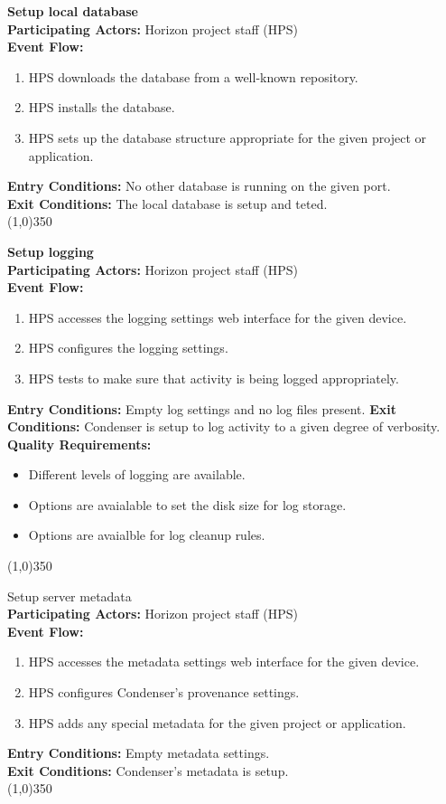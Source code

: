 		\textbf{Setup local database} \\		 
		\textbf{Participating Actors:} Horizon project staff (HPS)  \\
		\textbf{Event Flow:}
		\begin{enumerate}
\item HPS downloads the database from a well-known repository.
\item HPS installs the database.
\item HPS sets up the database structure appropriate for the given project or application.
	    \end{enumerate}
		\textbf{Entry Conditions:} No other database is running on the given port.\\
		\textbf{Exit Conditions:} The local database is setup and teted.\\
		\line(1,0){350}
						 
		\textbf{Setup logging} \\	 
		\textbf{Participating Actors:} Horizon project staff (HPS)  \\
		\textbf{Event Flow:}
		\begin{enumerate}
\item HPS accesses the logging settings web interface for the given device. 
\item HPS configures the logging settings.
\item HPS tests to make sure that activity is being logged appropriately.
	    \end{enumerate}
		\textbf{Entry Conditions:} Empty log settings and no log files present.
		\textbf{Exit Conditions:} Condenser is setup to log activity to a given degree of verbosity.
		\textbf{Quality Requirements:}
		\begin{itemize}
\item Different levels of logging are available.
\item Options are avaialable to set the disk size for log storage.
\item Options are avaialble for log cleanup rules.
		\end{itemize}
		\line(1,0){350}
						 
		Setup server metadata \\
		\textbf{Participating Actors:} Horizon project staff (HPS)  \\
		\textbf{Event Flow:}
		\begin{enumerate}
\item HPS accesses the metadata settings web interface for the given device. 
\item HPS configures Condenser's provenance settings.
\item HPS adds any special metadata for the given project or application.
	    \end{enumerate}
		\textbf{Entry Conditions:} Empty metadata settings.\\
		\textbf{Exit Conditions:} Condenser's metadata is setup.\\
		\line(1,0){350}
				 
